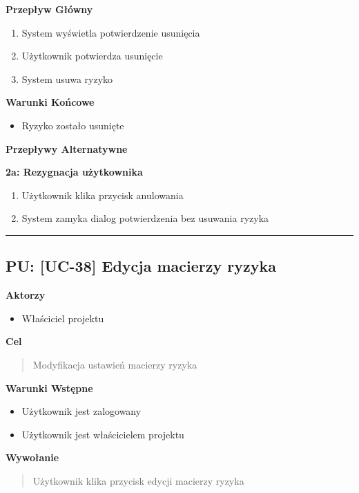 \vspace{0.2cm}
\noindent\textbf{Przepływ Główny}
\begin{enumerate}
    \item System wyświetla potwierdzenie usunięcia
    \item Użytkownik potwierdza usunięcie
    \item System usuwa ryzyko
\end{enumerate}

\vspace{0.2cm}
\noindent\textbf{Warunki Końcowe}
\begin{itemize}
    \item Ryzyko zostało usunięte
\end{itemize}

\vspace{0.2cm}
\noindent\textbf{Przepływy Alternatywne}

\textbf{2a: Rezygnacja użytkownika}
\begin{enumerate}
    \item Użytkownik klika przycisk anulowania
    \item System zamyka dialog potwierdzenia bez usuwania ryzyka
\end{enumerate}


\hrule
\vspace{1cm}

\subsection*{PU: [UC-38] Edycja macierzy ryzyka}

\noindent\textbf{Aktorzy}
\begin{itemize}
    \item Właściciel projektu
\end{itemize}

\vspace{0.2cm}
\noindent\textbf{Cel}
\begin{quote}
    Modyfikacja ustawień macierzy ryzyka
\end{quote}

\vspace{0.2cm}
\noindent\textbf{Warunki Wstępne}
\begin{itemize}
    \item Użytkownik jest zalogowany
    \item Użytkownik jest właścicielem projektu
\end{itemize}

\vspace{0.2cm}
\noindent\textbf{Wywołanie}
\begin{quote}
    Użytkownik klika przycisk edycji macierzy ryzyka
\end{quote}

